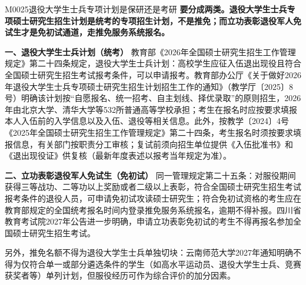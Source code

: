 \begin{qa}{M0025}{退役大学生士兵专项计划是保研还是考研}
\textbf{要分成两类。退役大学生士兵专项硕士研究生招生计划是统考的专项招生计划，不是推免；而立功表彰退役军人免试生才是免初试通道，走推免服务系统报名。}

\textbf{一、退役大学生士兵计划（统考）}
教育部《2026年全国硕士研究生招生工作管理规定》第二十四条规定，退役大学生士兵计划：高校学生应征入伍退出现役且符合全国硕士研究生招生考试报考条件，可以申请报考。教育部办公厅《关于做好2026年退役大学生士兵专项硕士研究生招生计划招生工作的通知》（教学厅〔2025〕8号）明确该计划按“自愿报名、统一招考、自主划线、择优录取”的原则招生，2026年由北京大学、清华大学等532所普通高等学校承担；考生在报名时应按要求填报本人入伍前的入学信息以及入伍、退役等相关信息。此外，按教学〔2024〕4号《2025年全国硕士研究生招生工作管理规定》第二十四条，考生报名时须按要求填报信息，有关部门按职责分工审核；复试前须向招生单位提供《入伍批准书》和《退出现役证》供复核（最新年度表述以报考当年规定为准）。

\textbf{二、立功表彰退役军人免试生（免初试）}
同一管理规定第二十五条：对服役期间获得三等战功、二等功以上奖励或者二级以上表彰，符合全国硕士研究生招生考试报考条件的退役人员，可申请免初试攻读硕士研究生；符合免初试资格的考生应在教育部规定的全国统考报名时间内登录推免服务系统报名，逾期不得补报。四川省教育考试院2027年公告进一步明确，申请立功表彰免初试的考生不得再报名参加全国硕士研究生招生考试。

另外，推免名额不得为退役大学生士兵单独切块：云南师范大学2027年通知明确不得为仅符合单一或部分遴选条件的学生（如高水平运动员、退役大学生士兵、竞赛获奖者等）单列计划，但服役经历可作为综合评价的加分因素。
\end{qa}

